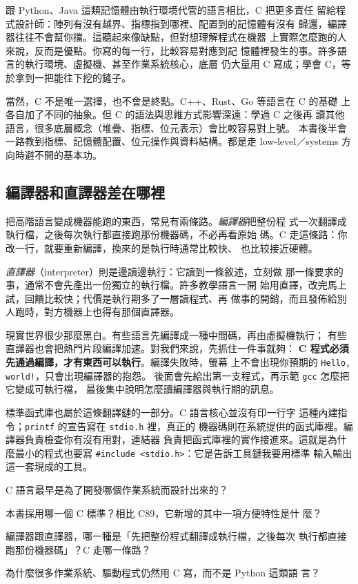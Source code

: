 跟 Python、Java 這類記憶體由執行環境代管的語言相比，C 把更多責任
留給程式設計師：陣列有沒有越界、指標指到哪裡、配置到的記憶體有沒有
歸還，編譯器往往不會幫你擋。這聽起來像缺點，但對想理解程式在機器
上實際怎麼跑的人來說，反而是優點。你寫的每一行，比較容易對應到記
憶體裡發生的事。許多語言的執行環境、虛擬機、甚至作業系統核心，底層
仍大量用 C 寫成；學會 C，等於拿到一把能往下挖的鏟子。

當然，C 不是唯一選擇，也不會是終點。C++、Rust、Go 等語言在 C 的基礎
上各自加了不同的抽象。但 C 的語法與思維方式影響深遠：學過 C 之後再
讀其他語言，很多底層概念（堆疊、指標、位元表示）會比較容易對上號。
本書後半會一路教到指標、記憶體配置、位元操作與資料結構。都是走
low-level／systems 方向時避不開的基本功。


\subsection{編譯器和直譯器差在哪裡}

把高階語言變成機器能跑的東西，常見有兩條路。\emph{編譯器}把整份程
式一次翻譯成執行檔，之後每次執行都直接跑那份機器碼，不必再看原始
碼。C 走這條路：你改一行，就要重新編譯，換來的是執行時通常比較快、
也比较接近硬體。

\emph{直譯器}（interpreter）則是邊讀邊執行：它讀到一條敘述，立刻做
那一條要求的事，通常不會先產出一份獨立的執行檔。許多教學語言一開
始用直譯，改完馬上試，回饋比較快；代價是執行期多了一層讀程式、再
做事的開銷，而且發佈給別人跑時，對方機器上也得有那個直譯器。

現實世界很少那麼黑白。有些語言先編譯成一種中間碼，再由虛擬機執行；
有些直譯器也會把熱門片段編譯加速。對我們來說，先抓住一件事就夠：
\textbf{C 程式必須先通過編譯，才有東西可以執行}。編譯失敗時，螢幕
上不會出現你預期的 \texttt{Hello, world!}，只會出現編譯器的抱怨。
後面會先給出第一支程式，再示範 \texttt{gcc} 怎麼把它變成可執行檔，
最後集中說明怎麼讀編譯器與執行期的訊息。

標準函式庫也屬於這條翻譯鏈的一部分。C 語言核心並沒有印一行字
這種內建指令；\texttt{printf} 的宣告寫在 \texttt{stdio.h} 裡，真正的
機器碼則在系統提供的函式庫裡。編譯器負責檢查你有沒有用對，連結器
負責把函式庫裡的實作接進來。這就是為什麼最小的程式也要寫
\texttt{\#include <stdio.h>}：它是告訴工具鏈我要用標準
輸入輸出這一套現成的工具。

\begin{drills}[label=drills:intro-why-c]
\item C 語言最早是為了開發哪個作業系統而設計出來的？
\item 本書採用哪一個 C 標準？相比 C89，它新增的其中一項方便特性是什
麼？
\item 編譯器跟直譯器，哪一種是「先把整份程式翻譯成執行檔，之後每次
執行都直接跑那份機器碼」？C 走哪一條路？
\item 為什麼很多作業系統、驅動程式仍然用 C 寫，而不是 Python 這類語
言？
\end{drills}

